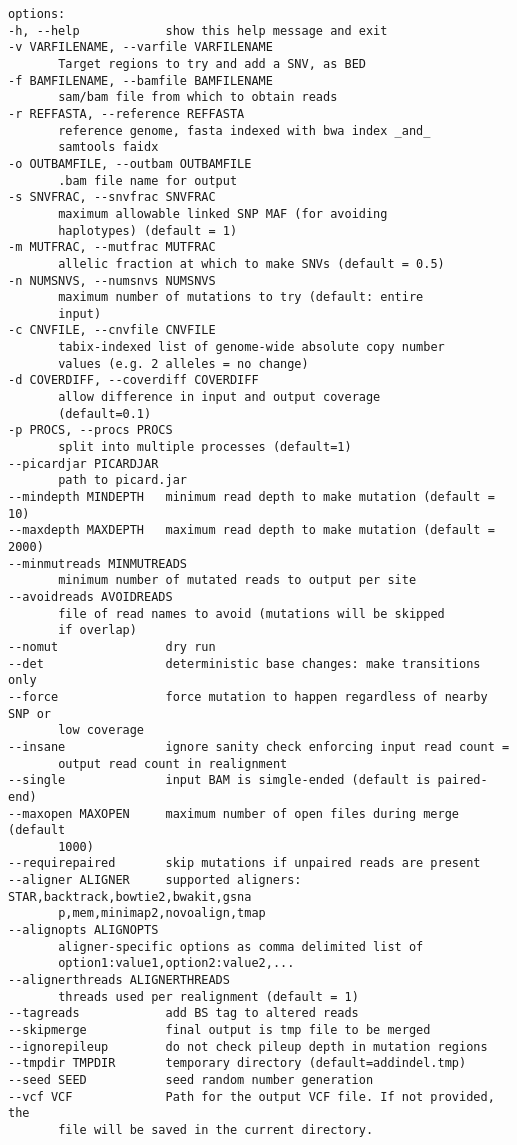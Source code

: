 \documentclass[letterpaper,11pt]{article}
\begin{document}
\begin{verbatim}
options:
-h, --help            show this help message and exit
-v VARFILENAME, --varfile VARFILENAME
       Target regions to try and add a SNV, as BED
-f BAMFILENAME, --bamfile BAMFILENAME
       sam/bam file from which to obtain reads
-r REFFASTA, --reference REFFASTA
       reference genome, fasta indexed with bwa index _and_
       samtools faidx
-o OUTBAMFILE, --outbam OUTBAMFILE
       .bam file name for output
-s SNVFRAC, --snvfrac SNVFRAC
       maximum allowable linked SNP MAF (for avoiding
       haplotypes) (default = 1)
-m MUTFRAC, --mutfrac MUTFRAC
       allelic fraction at which to make SNVs (default = 0.5)
-n NUMSNVS, --numsnvs NUMSNVS
       maximum number of mutations to try (default: entire
       input)
-c CNVFILE, --cnvfile CNVFILE
       tabix-indexed list of genome-wide absolute copy number
       values (e.g. 2 alleles = no change)
-d COVERDIFF, --coverdiff COVERDIFF
       allow difference in input and output coverage
       (default=0.1)
-p PROCS, --procs PROCS
       split into multiple processes (default=1)
--picardjar PICARDJAR
       path to picard.jar
--mindepth MINDEPTH   minimum read depth to make mutation (default = 10)
--maxdepth MAXDEPTH   maximum read depth to make mutation (default = 2000)
--minmutreads MINMUTREADS
       minimum number of mutated reads to output per site
--avoidreads AVOIDREADS
       file of read names to avoid (mutations will be skipped
       if overlap)
--nomut               dry run
--det                 deterministic base changes: make transitions only
--force               force mutation to happen regardless of nearby SNP or
       low coverage
--insane              ignore sanity check enforcing input read count =
       output read count in realignment
--single              input BAM is simgle-ended (default is paired-end)
--maxopen MAXOPEN     maximum number of open files during merge (default
       1000)
--requirepaired       skip mutations if unpaired reads are present
--aligner ALIGNER     supported aligners: STAR,backtrack,bowtie2,bwakit,gsna
       p,mem,minimap2,novoalign,tmap
--alignopts ALIGNOPTS
       aligner-specific options as comma delimited list of
       option1:value1,option2:value2,...
--alignerthreads ALIGNERTHREADS
       threads used per realignment (default = 1)
--tagreads            add BS tag to altered reads
--skipmerge           final output is tmp file to be merged
--ignorepileup        do not check pileup depth in mutation regions
--tmpdir TMPDIR       temporary directory (default=addindel.tmp)
--seed SEED           seed random number generation
--vcf VCF             Path for the output VCF file. If not provided, the
       file will be saved in the current directory.

\end{verbatim}
\end{document}
